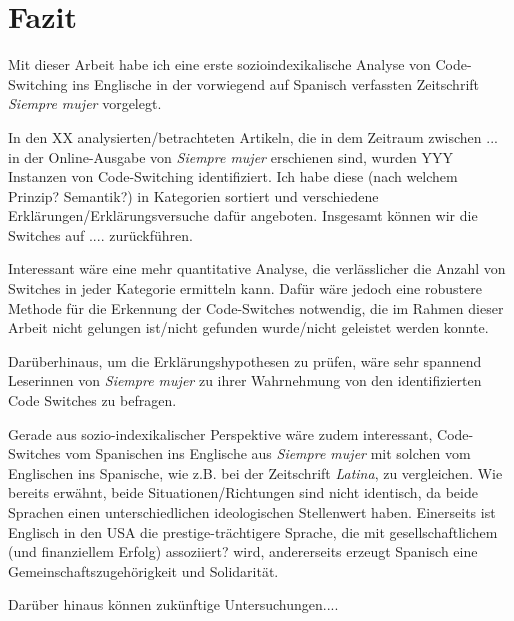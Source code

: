 \section{Fazit}
\label{chap:conclusion}

Mit dieser Arbeit habe ich eine erste sozioindexikalische Analyse von Code-Switching ins Englische in der vorwiegend auf Spanisch verfassten Zeitschrift \textit{Siempre mujer} vorgelegt.

In den XX analysierten/betrachteten Artikeln, die in dem Zeitraum zwischen ... in der Online-Ausgabe von \textit{Siempre mujer} erschienen sind, wurden YYY Instanzen von Code-Switching identifiziert.
Ich habe diese (nach welchem Prinzip? Semantik?) in Kategorien sortiert und verschiedene Erklärungen/Erklärungsversuche dafür angeboten.
Insgesamt können wir die Switches auf .... zurückführen.

Interessant wäre eine mehr quantitative Analyse, die verlässlicher die Anzahl von Switches in jeder Kategorie ermitteln kann.
Dafür wäre jedoch eine robustere Methode für die Erkennung der Code-Switches notwendig, die im Rahmen dieser Arbeit nicht gelungen ist/nicht gefunden wurde/nicht geleistet werden konnte.


Darüberhinaus, um die Erklärungshypothesen zu prüfen, wäre sehr spannend Leserinnen von \textit{Siempre mujer} zu ihrer Wahrnehmung von den identifizierten Code Switches zu befragen.

Gerade aus sozio-indexikalischer Perspektive wäre zudem interessant, Code-Switches vom Spanischen ins Englische aus \textit{Siempre mujer} mit solchen vom Englischen ins Spanische, wie z.B. bei der Zeitschrift \textit{Latina}, zu vergleichen.
Wie bereits erwähnt, beide Situationen/Richtungen sind nicht identisch, da beide Sprachen einen unterschiedlichen ideologischen Stellenwert haben.
Einerseits ist Englisch in den USA die prestige-trächtigere Sprache, die mit gesellschaftlichem (und finanziellem Erfolg) assoziiert? wird,
andererseits erzeugt Spanisch eine Gemeinschaftszugehörigkeit und Solidarität.

Darüber hinaus können zukünftige Untersuchungen....



